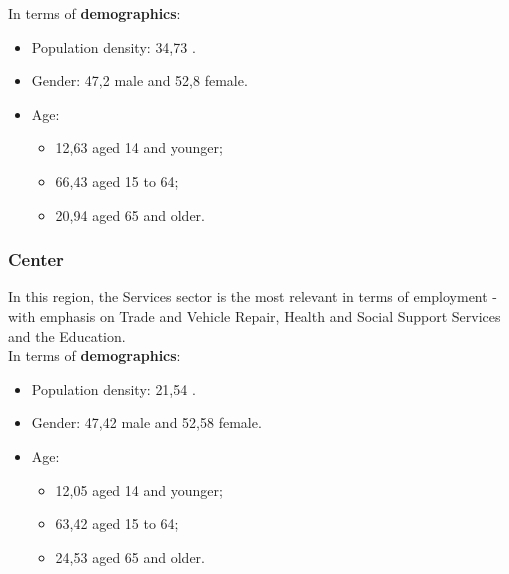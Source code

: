 In terms of {\textbf{demographics}}:
    \begin{itemize}
        \item Population density: {34,73\textdiscount} . 
        \item Gender: {47,2\textdiscount} male and {52,8\textdiscount} female.
        \item Age: 
        \begin{itemize}
        \item {12,63 \textdiscount} aged 14 and younger;
        \item {66,43\textdiscount} aged 15 to 64;
        \item {20,94\textdiscount} aged 65 and older.
        \end{itemize}
    \end{itemize}

\subsubsection{Center}
In this region, the Services sector is the most relevant in terms of employment - with emphasis on Trade and Vehicle Repair, Health and Social Support Services and the Education. \\
In terms of {\textbf{demographics}}:
    \begin{itemize}
        \item Population density: {21,54\textdiscount} . 
        \item Gender: {47,42\textdiscount} male and {52,58\textdiscount} female.
        \item Age: 
        \begin{itemize}
        \item {12,05 \textdiscount} aged 14 and younger;
        \item {63,42\textdiscount} aged 15 to 64;
        \item {24,53\textdiscount} aged 65 and older.
        \end{itemize}
    \end{itemize}
    
